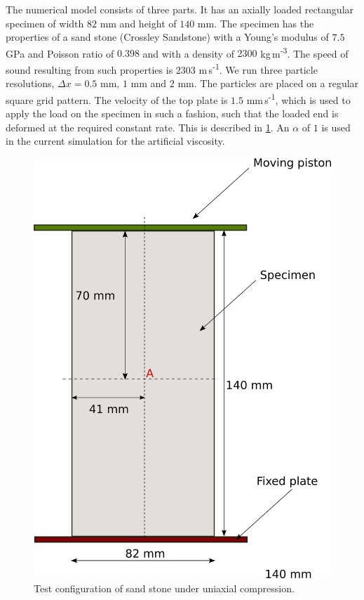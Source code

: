 \documentclass[preprint,12pt]{elsarticle}
\begin{document}
The numerical model consists of three parts. It has an axially loaded
rectangular specimen of width $82$ mm and height of $140$ mm. The specimen has
the properties of a sand stone (Crossley Sandstone) with a Young's modulus of
$7.5$ GPa and Poisson ratio of $0.398$ and with a density of $2300$
kg\,m\textsuperscript{-3}. The speed of sound resulting from such properties is
$2303$ m\,s\textsuperscript{-1}. We run three particle resolutions,
$\Delta x = 0.5$ mm, $1$ mm and $2$ mm. The particles are placed on a regular
square grid pattern. The velocity of the top plate is
$1.5$ mm\,s\textsuperscript{-1}, which is used to apply the load on the specimen in
such a fashion, such that the loaded end is deformed at the required constant
rate. This is described in \cref{fig:uniaxial_test_configuration}. An $\alpha$
of $1$ is used in the current simulation for the artificial viscosity.

\begin{figure}[!htpb]
  \centering
  \includegraphics[width=1\linewidth]{fig_23}
  \caption{Test configuration of sand stone under uniaxial compression.}
\label{fig:uniaxial_test_configuration}
\end{figure}
\end{document}
